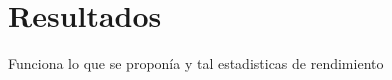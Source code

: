 \chapter{Resultados}
\label{chap:resultados}

     Funciona lo que se proponía y tal
     estadisticas de rendimiento

